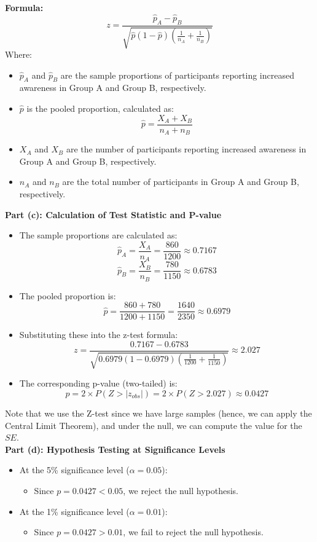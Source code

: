 \documentclass{article}
\begin{document}
\textbf{Formula:}
\[
z = \frac{ \hat{p}_A - \hat{p}_B }{ \sqrt{\hat{p}(1-\hat{p}) \left(\frac{1}{n_A} + \frac{1}{n_B}\right)} }
\]
Where:
\begin{itemize}
    \item \( \hat{p}_A \) and \( \hat{p}_B \) are the sample proportions of participants reporting increased awareness in Group A and Group B, respectively.
    \item \( \hat{p} \) is the pooled proportion, calculated as:
    \[
    \hat{p} = \frac{X_A + X_B}{n_A + n_B}
    \]
    \item \( X_A \) and \( X_B \) are the number of participants reporting increased awareness in Group A and Group B, respectively.
    \item \( n_A \) and \( n_B \) are the total number of participants in Group A and Group B, respectively.
\end{itemize}


\textbf{Part (c): Calculation of Test Statistic and P-value}

\begin{itemize}
    \item The sample proportions are calculated as:
    \[
    \hat{p}_A = \frac{X_A}{n_A} = \frac{860}{1200} \approx 0.7167
    \]
    \[
    \hat{p}_B = \frac{X_B}{n_B} = \frac{780}{1150} \approx 0.6783
    \]
    \item The pooled proportion is:
    \[
    \hat{p} = \frac{860 + 780}{1200 + 1150} = \frac{1640}{2350} \approx 0.6979
    \]
    \item Substituting these into the z-test formula:
    \[
    z = \frac{0.7167 - 0.6783}{\sqrt{0.6979(1 - 0.6979) \left(\frac{1}{1200} + \frac{1}{1150}\right)}} \approx 2.027
    \]
    \item The corresponding p-value (two-tailed) is:
    \[
    p = 2 \times P(Z > |z_{obs}|) =  2 \times P(Z > 2.027 )  \approx 0.0427
    \]
\end{itemize}

Note that we use the Z-test since we have large samples (hence, we can apply the Central Limit Theorem), and under the null, we can compute the value for the $SE$. \\

\textbf{Part (d): Hypothesis Testing at Significance Levels}

\begin{itemize}
    \item At the 5\% significance level (\( \alpha = 0.05 \)):
    \begin{itemize}
        \item Since \( p = 0.0427 < 0.05 \), we reject the null hypothesis.
    \end{itemize}
    \item At the 1\% significance level (\( \alpha = 0.01 \)):
    \begin{itemize}
        \item Since \( p = 0.0427 > 0.01 \), we fail to reject the null hypothesis.
    \end{itemize}
\end{itemize}
\end{document}
